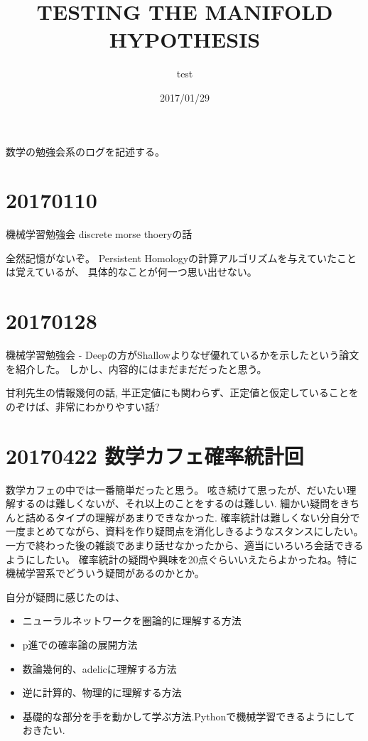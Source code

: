 \documentclass{ujarticle}
\title{TESTING THE MANIFOLD HYPOTHESIS}
\author{test}
\date{2017/01/29}
\begin{document}
数学の勉強会系のログを記述する。


\section{20170110}
\label{sec:20170110}
機械学習勉強会
discrete morse thoeryの話

全然記憶がないぞ。
Persistent Homologyの計算アルゴリズムを与えていたことは覚えているが、
具体的なことが何一つ思い出せない。

\section{20170128}
\label{sec:20170128}
機械学習勉強会
- Deepの方がShallowよりなぜ優れているかを示したという論文を紹介した。
しかし、内容的にはまだまだだったと思う。

甘利先生の情報幾何の話,
半正定値にも関わらず、正定値と仮定していることをのぞけば、非常にわかりやすい話?

\section{20170422 数学カフェ確率統計回}
\label{sec:20170422}
数学カフェの中では一番簡単だったと思う。
呟き続けて思ったが、だいたい理解するのは難しくないが、それ以上のことをするのは難しい.
細かい疑問をきちんと詰めるタイプの理解があまりできなかった.
確率統計は難しくない分自分で一度まとめてながら、資料を作り疑問点を消化しきるようなスタンスにしたい。
一方で終わった後の雑談であまり話せなかったから、適当にいろいろ会話できるようにしたい。
確率統計の疑問や興味を20点ぐらいいえたらよかったね。特に機械学習系でどういう疑問があるのかとか。

自分が疑問に感じたのは、
\begin{itemize}
  \item ニューラルネットワークを圏論的に理解する方法
  \item p進での確率論の展開方法
  \item 数論幾何的、adelicに理解する方法
  \item 逆に計算的、物理的に理解する方法
  \item 基礎的な部分を手を動かして学ぶ方法.Pythonで機械学習できるようにしておきたい.
\end{itemize}
\end{document}
